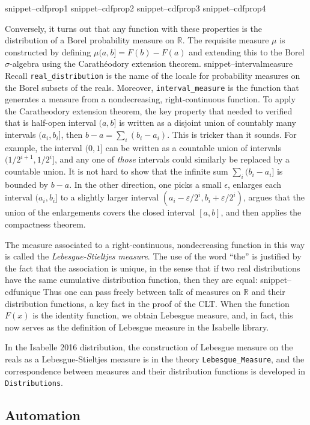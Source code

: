 \documentclass{svjour3}
\newcommand{\RR}{\mathbb{R}}
\newcommand{\Snippet}[1]{\csname snippet--#1\endcsname}
\begin{document}
\Snippet{cdfprop1}
\Snippet{cdfprop2}
\Snippet{cdfprop3}
\Snippet{cdfprop4}

Conversely, it turns out that any function with these properties is the distribution of a Borel probability measure on $\RR$. The requisite measure $\mu$ is constructed by defining $\mu (a,b] = F(b) - F(a)$ and extending this to the Borel $\sigma$-algebra using the Carath\'eodory extension theorem.
\Snippet{intervalmeasure}
Recall \texttt{real\_distribution} is the name of the locale for probability measures on the Borel subsets of the reals. Moreover, \texttt{interval\_measure} is the function that generates a measure from a nondecreasing, right-continuous function. To apply the Caratheodory extension theorem, the key property that needed to verified that is half-open interval $(a, b]$ is written as a disjoint union of countably many intervals $(a_i, b_i]$, then $b - a = \sum_i (b_i - a_i)$. This is tricker than it sounds. For example, the interval $(0, 1]$ can be written as a countable union of intervals $(1/2^{i+1}, 1/2^i]$, and any one of \emph{those} intervals could similarly be replaced by a countable union. It is not hard to show that the infinite sum $\sum_i (b_i - a_i]$ is bounded by $b - a$. In the other direction, one picks a small $\epsilon$, enlarges each interval $(a_i, b_i]$ to a slightly larger interval $(a_i - \varepsilon/2^i, b_i + \varepsilon / 2^i)$, argues that the union of the enlargements covers the closed interval $[a, b]$, and then applies the compactness theorem.

The measure associated to a right-continuous, nondecreasing function in this way is called the \emph{Lebesgue-Stieltjes measure}. The use of the word ``the'' is justified by the fact that the association is unique, in the sense that if two real distributions have the same cumulative distribution function, then they are equal: 
\Snippet{cdfunique}
Thus one can pass freely between talk of measures on $\RR$ and their distribution functions, a key fact in the proof of the CLT. When the function $F(x)$ is the identity function, we obtain Lebesgue measure, and, in fact, this now serves as the definition of Lebesgue measure in the Isabelle library.

In the Isabelle 2016 distribution, the construction of Lebesgue measure on the reals as a Lebesgue-Stieltjes measure is in the theory \verb=Lebesgue_Measure=, and the correspondence between measures and their distribution functions is developed in \verb=Distributions=.

\subsection{Automation}
\label{subsection:automation}
\end{document}
